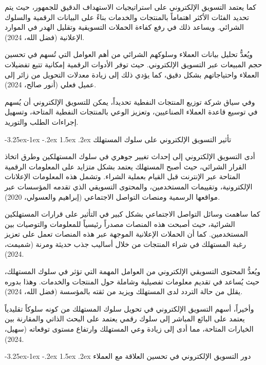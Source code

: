 \documentclass[12pt, a4paper]{report}
\makeatletter
\renewcommand\subsection{\@startsection{subsection}{2}{\z@}%
  {-3.25ex\@plus -1ex \@minus -.2ex}%
  {1.5ex \@plus .2ex}%
  {\normalfont\large\bfseries\color{sectiongray}}}
\makeatother
\begin{document}
كما يعتمد التسويق الإلكتروني على استراتيجيات الاستهداف الدقيق للجمهور، حيث يتم تحديد الفئات الأكثر اهتماماً بالمنتجات والخدمات بناءً على البيانات الرقمية والسلوك الشرائي. ويساعد ذلك في رفع كفاءة الحملات التسويقية وتقليل الهدر في الموارد الإعلانية (فضل الله، 2024).

ويُعدُّ تحليل بيانات العملاء وسلوكهم الشرائي من أهم العوامل التي تُسهم في تحسين حجم المبيعات عبر التسويق الإلكتروني. حيث توفر الأدوات الرقمية إمكانية تتبع تفضيلات العملاء واحتياجاتهم بشكل دقيق، كما يؤدي ذلك إلى زيادة معدلات التحويل من زائر إلى عميل فعلي (أنور صالح، 2024).

وفي سياق شركة توزيع المنتجات النفطية تحديداً، يمكن للتسويق الإلكتروني أن يُسهم في توسيع قاعدة العملاء الصناعيين، وتعزيز الوعي بالمنتجات النفطية المتاحة، وتسهيل إجراءات الطلب والتوريد.

\subsection{تأثير التسويق الإلكتروني على سلوك المستهلك}

أدى التسويق الإلكتروني إلى إحداث تغيير جوهري في سلوك المستهلكين وطرق اتخاذ القرار الشرائي، حيث أصبح المستهلك يعتمد بشكل متزايد على المعلومات الرقمية المتاحة عبر الإنترنت قبل القيام بعملية الشراء. وتشمل هذه المعلومات الإعلانات الإلكترونية، وتقييمات المستخدمين، والمحتوى التسويقي الذي تقدمه المؤسسات عبر مواقعها الرسمية ومنصات التواصل الاجتماعي (إبراهيم والعسولي، 2020).

كما ساهمت وسائل التواصل الاجتماعي بشكل كبير في التأثير على قرارات المستهلكين الشرائية، حيث أصبحت هذه المنصات مصدراً رئيسياً للمعلومات والتوصيات بين المستخدمين. كما أن الحملات الإعلانية الموجهة عبر هذه المنصات تعمل على تعزيز رغبة المستهلك في شراء المنتجات من خلال أساليب جذب حديثة ومرنة (شميمت، 2024).

ويُعدُّ المحتوى التسويقي الإلكتروني من العوامل المهمة التي تؤثر في سلوك المستهلك، حيث يُساعد في تقديم معلومات تفصيلية وشاملة حول المنتجات والخدمات. وهذا بدوره يقلل من حالة التردد لدى المستهلك ويزيد من ثقته بالمؤسسة (فضل الله، 2024).

وأخيراً، أسهم التسويق الإلكتروني في تحويل سلوك المستهلك من كونه سلوكاً تقليدياً يعتمد على البائع المباشر إلى سلوك رقمي يعتمد على البحث الذاتي والمقارنة بين الخيارات المتاحة، مما أدى إلى زيادة وعي المستهلك وارتفاع مستوى توقعاته (سهيل، 2024).

\subsection{دور التسويق الإلكتروني في تحسين العلاقة مع العملاء}
\end{document}
